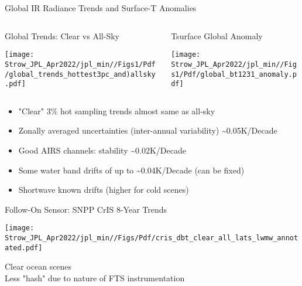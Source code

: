 \documentclass[10pt,t]{beamer}
\begin{document}
\begin{frame}[label={sec:org58f619b}]{Global IR Radiance Trends and Surface-T Anomalies}
\vspace{-0.35in}

\begin{columns}
\begin{column}{0.55\columnwidth}
\begin{block}{\footnotesize Global Trends: Clear vs All-Sky}
\vspace{-0.1in}
\begin{center}
\texttt{[image: Strow\_JPL\_Apr2022/jpl\_min//Figs1/Pdf/global\_trends\_hottest3pc\_and)allsky.pdf]}
\end{center}
\end{block}
\end{column}


\begin{column}{0.5\columnwidth}
\begin{block}{\footnotesize Tsurface Global Anomaly}
\vspace{-0.05in}
\begin{center}
\texttt{[image: Strow\_JPL\_Apr2022/jpl\_min//Figs1/Pdf/global\_bt1231\_anomaly.pdf]}
\end{center}
\end{block}
\end{column}
\end{columns}

\vspace{-0.1in}
\small
\begin{itemize}
\item "Clear" 3\% hot sampling trends almost same as all-sky
\item Zonally averaged uncertainties (inter-annual variability) \textasciitilde{}0.05K/Decade
\item Good AIRS channels: stability \textasciitilde{}0.02K/Decade
\item Some water band drifts of up to \textasciitilde{}0.04K/Decade (can be fixed)
\item Shortwave known drifts (higher for cold scenes)
\end{itemize}
\end{frame}


\begin{frame}[label={sec:org2c94097}]{Follow-On Sensor: SNPP CrIS 8-Year Trends}
\begin{center}
\texttt{[image: Strow\_JPL\_Apr2022/jpl\_min//Figs/Pdf/cris\_dbt\_clear\_all\_lats\_lwmw\_annotated.pdf]}
\end{center}

\vspace{-0.1in}
\footnotesize Clear ocean scenes \\
\footnotesize Less "hash" due to nature of FTS instrumentation
\end{frame}
\end{document}
